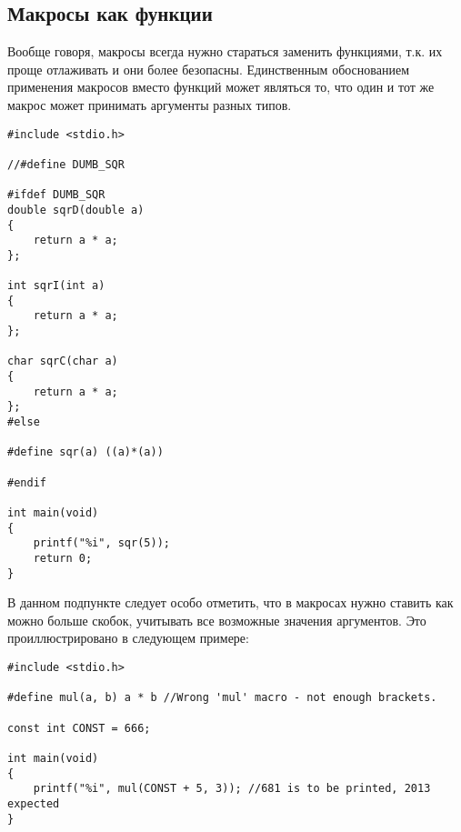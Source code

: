 \documentclass[a4paper]{article}
\begin{document}
\subsection{Макросы как функции}

	Вообще говоря, макросы всегда нужно стараться заменить функциями, т.к. их проще отлаживать и они более безопасны.
	Единственным обоснованием применения макросов вместо функций может являться то, что один и тот же макрос может принимать аргументы разных типов.
\newpage
	\begin{lstlisting}[caption={Macro Function}]
#include <stdio.h>

//#define DUMB_SQR

#ifdef DUMB_SQR
double sqrD(double a)
{
    return a * a;
};

int sqrI(int a)
{
    return a * a;
};

char sqrC(char a)
{
    return a * a;
};
#else
 
#define sqr(a) ((a)*(a))

#endif

int main(void)
{
    printf("%i", sqr(5));
    return 0;
}
	\end{lstlisting}
	В данном подпункте следует особо отметить, что в макросах нужно ставить как можно больше скобок, учитывать все возможные значения аргументов. Это проиллюстрировано в следующем примере:
		\begin{lstlisting}[caption={Wrong mul}]
#include <stdio.h>

#define mul(a, b) a * b //Wrong 'mul' macro - not enough brackets.

const int CONST = 666;

int main(void)
{
    printf("%i", mul(CONST + 5, 3)); //681 is to be printed, 2013 expected
}
	\end{lstlisting}
	
\newpage	
	
\end{document}

